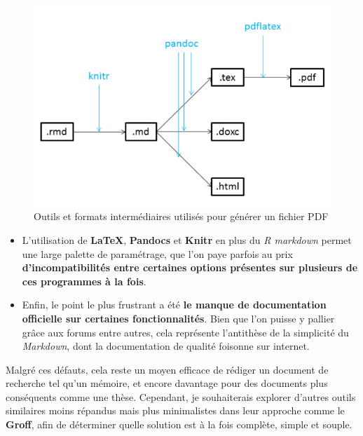 \documentclass[
  11pt,
  french,
]{article}
\begin{document}
\begin{tcolorbox}
\begin{figure}

{\centering \includegraphics[width=0.9\linewidth]{__imgs/pandoc1} 

}

\caption[Outils et formats intermédiaires utilisés pour générer un fichier PDF  -  https://markdown-it.github.io/]{Outils et formats intermédiaires utilisés pour générer un fichier PDF}\label{fig:pandoc}
\end{figure}
\end{tcolorbox}

\begin{itemize}
\item
  L'utilisation de \textbf{LaTeX}, \textbf{Pandocs} et \textbf{Knitr} en
  plus du \emph{R markdown} permet une large palette de paramétrage, que
  l'on paye parfois au prix \textbf{d'incompatibilités entre certaines
  options présentes sur plusieurs de ces programmes à la fois}.
\item
  Enfin, le point le plus frustrant a été \textbf{le manque de
  documentation officielle sur certaines fonctionnalités}. Bien que l'on
  puisse y pallier grâce aux forums entre autres, cela représente
  l'antithèse de la simplicité du \emph{Markdown}, dont la documentation
  de qualité foisonne sur internet.
\end{itemize}

Malgré ces défauts, cela reste un moyen efficace de rédiger un document
de recherche tel qu'un mémoire, et encore davantage pour des documents
plus conséquents comme une thèse. Cependant, je souhaiterais explorer
d'autres outils similaires moins répandus mais plus minimalistes dans
leur approche comme le \textbf{Groff}, afin de déterminer quelle
solution est à la fois complète, simple et souple.
\end{document}
